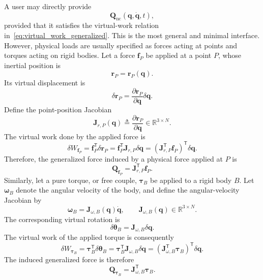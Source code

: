 \documentclass{article}
\begin{document}
A user may directly provide
\[
\bm Q_{\mathrm{nc}}(\bm q,\dot{\bm q},t),
\]
provided that it satisfies the virtual-work relation
in~\eqref{eq:virtual_work_generalized}. This is the most general and
minimal interface.
However, physical loads are usually specified as forces acting at points and
torques acting on rigid bodies. Let a force $\bm f_P$ be applied at a point
$P$, whose inertial position is
\[
\bm r_P=\bm r_P(\bm q).
\]
Its virtual displacement is
\[
\delta\bm r_P
=
\frac{\partial\bm r_P}{\partial\bm q}\delta\bm q.
\]
Define the point-position Jacobian
\begin{equation}
\bm J_{r,P}(\bm q)
\triangleq
\frac{\partial\bm r_P}{\partial\bm q}
\in\mathbb R^{3\times N}.
\end{equation}
The virtual work done by the applied force is
\begin{equation}
\delta W_{\bm f_P}
=
\bm f_P^{\mathsf T}\delta\bm r_P
=
\bm f_P^{\mathsf T}
\bm J_{r,P}\delta\bm q
=
\left(
\bm J_{r,P}^{\mathsf T}\bm f_P
\right)^{\mathsf T}
\delta\bm q.
\end{equation}
Therefore, the generalized force induced by a physical force applied at $P$
is
\begin{equation}
\boxed{
\bm Q_{\bm f_P}
=
\bm J_{r,P}^{\mathsf T}\bm f_P.
}
\label{eq:generalized_force_from_force}
\end{equation}
Similarly, let a pure torque, or free couple, $\bm \tau_B$ be applied to a
rigid body $B$. Let $\bm\omega_B$ denote the angular velocity of the body,
and define the angular-velocity Jacobian by
\begin{equation}
\bm\omega_B
=
\bm J_{\omega,B}(\bm q)\dot{\bm q},
\qquad
\bm J_{\omega,B}(\bm q)
\in\mathbb R^{3\times N}.
\end{equation}
The corresponding virtual rotation is
\[
\delta\bm\theta_B
=
\bm J_{\omega,B}\delta\bm q.
\]
The virtual work of the applied torque is consequently
\begin{equation}
\delta W_{\bm\tau_B}
=
\bm\tau_B^{\mathsf T}\delta\bm\theta_B
=
\bm\tau_B^{\mathsf T}
\bm J_{\omega,B}\delta\bm q
=
\left(
\bm J_{\omega,B}^{\mathsf T}\bm\tau_B
\right)^{\mathsf T}
\delta\bm q.
\end{equation}
The induced generalized force is therefore
\begin{equation}
\boxed{
\bm Q_{\bm\tau_B}
=
\bm J_{\omega,B}^{\mathsf T}\bm\tau_B.
}
\label{eq:generalized_force_from_torque}
\end{equation}
\end{document}
